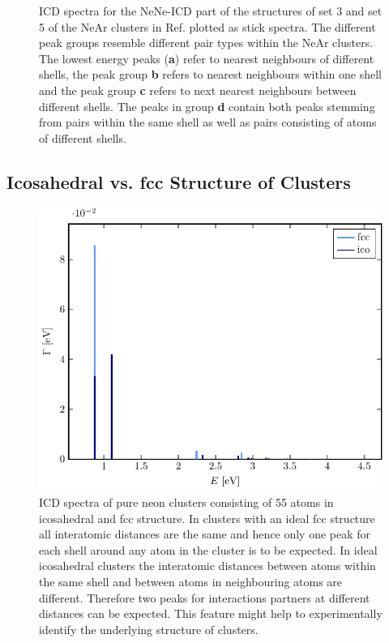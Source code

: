 \begin{figure}[h]
 \caption{ICD spectra for the NeNe-ICD part of the structures of set 3 and
          set 5 of the NeAr clusters in Ref. \cite{Fasshauer14_1}
          plotted as stick spectra.
          The different peak groups resemble different pair types
          within the NeAr clusters. The lowest energy peaks (\textbf{a})
          refer to nearest neighbours
          of different shells, the peak group \textbf{b} refers
          to nearest neighbours within one shell and the peak group \textbf{c}
          refers to next nearest neighbours between different shells.
          The peaks in group \textbf{d} contain both peaks stemming from
          pairs within the same shell as well as pairs consisting of atoms
          of different shells.}
 \label{figure:rot}
\end{figure}


\subsection{Icosahedral vs. fcc Structure of Clusters}
\begin{figure}[h]
 \centering
 \includegraphics[width=\columnwidth]{pics/reinNe}
 \caption{ICD spectra of pure neon clusters consisting of 55 atoms in
          icosahedral and fcc structure. In clusters with an ideal fcc structure
          all interatomic distances are the same and hence only one peak
          for each shell around any atom in the cluster is to be expected.
          In ideal icosahedral clusters the interatomic distances between atoms
          within the same shell and between atoms in neighbouring atoms
          are different. Therefore two peaks for interactions partners
          at different distances can be expected. This feature might
          help to experimentally identify the underlying structure of clusters.}
 \label{figure:reinNe}
\end{figure}
